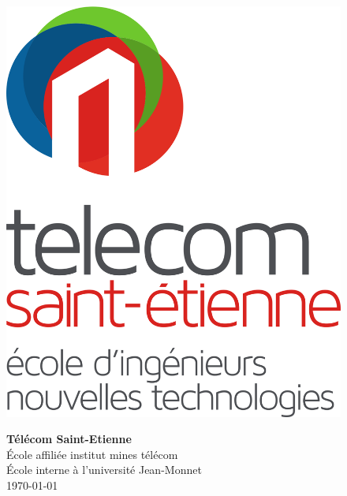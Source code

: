 \thispagestyle{empty} %

\begin{figure}[t]
    \begin{minipage}{0.2\textwidth}
        \includegraphics[width=\textwidth]{images/logo_telecom.png}
    \end{minipage}
    \hfill
    \begin{minipage}{0.5\textwidth}
        \begin{flushright}
            \textbf{Télécom Saint-Etienne}\\
            École affiliée institut mines télécom\\
            École interne à l'université Jean-Monnet\\[10pt]
            \today
        \end{flushright}
    \end{minipage}
\end{figure}

